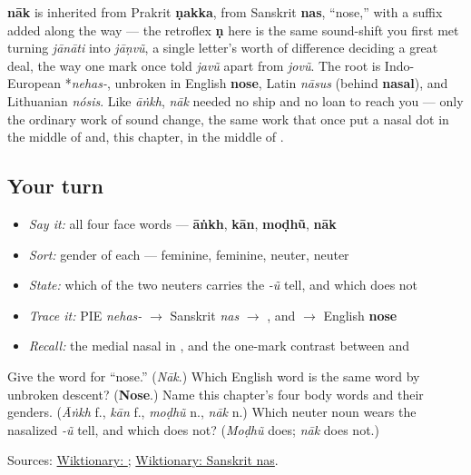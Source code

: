 \begin{cousinweb}
\textbf{nāk} is inherited from Prakrit \textbf{ṇakka}, from Sanskrit \textbf{nas}, \textquotedblleft{}nose,\textquotedblright{} with a suffix added along the way — the retroflex \textbf{ṇ} here is the same sound-shift you first met turning \emph{jānāti} into \emph{jāṇvũ}, a single letter's worth of difference deciding a great deal, the way one mark once told \emph{javũ} apart from \emph{jovũ}. The root is Indo-European *\emph{nehas-}, unbroken in English \textbf{nose}, Latin \emph{nāsus} (behind \textbf{nasal}), and Lithuanian \emph{nósis}. Like \emph{āṅkh}, \emph{nāk} needed no ship and no loan to reach you — only the ordinary work of sound change, the same work that once put a nasal dot in the middle of \textbf{} and, this chapter, in the middle of \textbf{}.
\end{cousinweb}

\subsection*{Your turn}
\begin{itemize}
\raggedright
  \item \emph{Say it:} all four face words — \textbf{āṅkh}, \textbf{kān}, \textbf{moḍhũ}, \textbf{nāk}
  \item \emph{Sort:} gender of each — feminine, feminine, neuter, neuter
  \item \emph{State:} which of the two neuters carries the \emph{-ũ} tell, and which does not
  \item \emph{Trace it:} PIE \emph{nehas-} $\to$ Sanskrit \emph{nas} $\to$ \textbf{}, and $\to$ English \textbf{nose}
  \item \emph{Recall:} the medial nasal in \textbf{}, and the one-mark contrast between \textbf{} and \textbf{}
\end{itemize}

\begin{tcolorbox}[breakable,colback=teal!4,colframe=teal!35!black,title={Before you move on}]
Give the word for \textquotedblleft{}nose.\textquotedblright{} (\emph{Nāk}.) Which English word is the same word by unbroken descent? (\textbf{Nose}.) Name this chapter's four body words and their genders. (\emph{Āṅkh} f., \emph{kān} f., \emph{moḍhũ} n., \emph{nāk} n.) Which neuter noun wears the nasalized \emph{-ũ} tell, and which does not? (\emph{Moḍhũ} does; \emph{nāk} does not.)

Sources: \href{https://en.wiktionary.org/wiki/\%E0\%AA\%A8\%E0\%AA\%BE\%E0\%AA\%95}{Wiktionary: }; \href{https://en.wiktionary.org/wiki/\%E0\%A4\%A8\%E0\%A4\%B8\%E0\%A5\%8D}{Wiktionary: Sanskrit nas}.
\end{tcolorbox}
